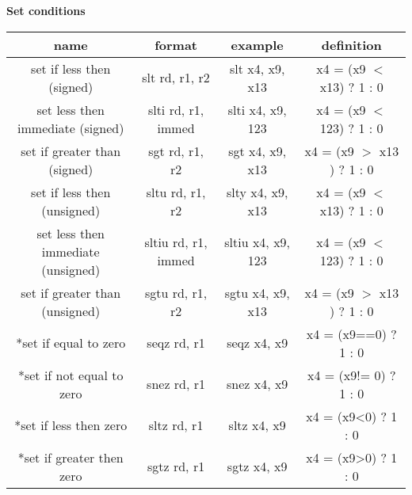 \documentclass{article}
\begin{document}
\begin{center}
  \textbf{Set conditions}

  \begin{tabular}{|c|c|c|c|}
    \hline
    name                               & format              & example           & definition            \\
    \hline
    set if less then (signed)          & slt rd, r1, r2      & slt x4, x9, x13   & x4 = (x9 $<$
    x13) ? 1 : 0                                                                                         \\
    set less then immediate (signed)   & slti rd, r1, immed  & slti x4, x9, 123  &
    x4 = (x9 $<$ 123) ? 1 : 0
    \\
    set if greater than (signed)       & sgt rd, r1, r2      & sgt x4, x9, x13   & x4 = (x9
    $>$ x13 ) ? 1 : 0
    \\
    set if less then (unsigned)        & sltu rd, r1, r2     & slty x4, x9, x13  & x4 = (x9 $<$
    x13) ? 1 : 0                                                                                         \\
    set less then immediate (unsigned) & sltiu rd, r1, immed & sltiu x4, x9, 123 &
    x4 = (x9 $<$ 123) ? 1 : 0                                                                            \\
    set if greater than (unsigned)     & sgtu rd, r1, r2     & sgtu x4, x9, x13  & x4 = (x9
    $>$ x13 ) ? 1 : 0
    \\
    *set if equal to zero               & seqz rd, r1         & seqz x4, x9       & x4 = (x9==0) ? 1 : 0  \\
    *set if not equal to zero           & snez rd, r1         & snez x4, x9       & x4 = (x9!= 0) ? 1 : 0
    \\
    *set if less then zero              & sltz rd, r1         & sltz x4, x9       & x4 = (x9<0) ? 1 : 0   \\
    *set if greater then zero           & sgtz rd, r1         & sgtz x4, x9       & x4 = (x9>0) ? 1 :  0  \\
    \hline
  \end{tabular}
\end{center}
\end{document}

